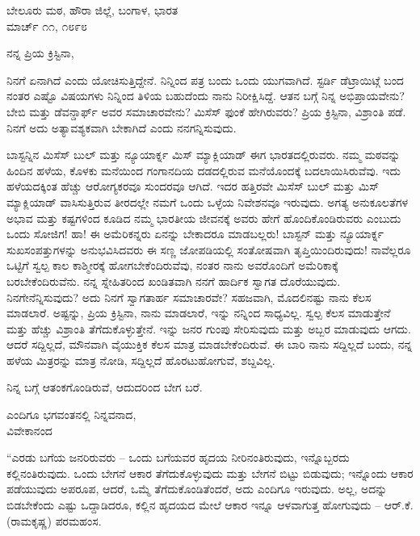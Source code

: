 \begin{flushright}
ಬೇಲೂರು ಮಠ, ಹೌರಾ ಜಿಲ್ಲೆ, ಬಂಗಾಳ, ಭಾರತ\\ಮಾರ್ಚ್ ೧೧, ೧೮೯೮
\end{flushright}

ನನ್ನ ಪ್ರಿಯ ಕ್ರಿಸ್ಟಿನಾ,

ನಿನಗೆ ಏನಾಗಿದೆ ಎಂದು ಯೋಚಿಸುತ್ತಿದ್ದೇನೆ. ನಿನ್ನಿಂದ ಪತ್ರ ಬಂದು ಒಂದು ಯುಗವಾಗಿದೆ. ಸ್ಟರ್ಡಿ ಡೆಟ್ರಾಯಿಟ್ಗೆ ಬಂದ ನಂತರ ಎಷ್ಟೊ ವಿಷಯಗಳು ನಿನ್ನಿಂದ ತಿಳಿಯ ಬಹುದೆಂದು ನಾನು ನಿರೀಕ್ಷಿಸಿದ್ದೆ. ಆತನ ಬಗ್ಗೆ ನಿನ್ನ ಅಭಿಪ್ರಾಯವೇನು? ಬೇಬಿ ಮತ್ತು ಡೆವನ್ಡಾರ್ಫ್ ಅವರ ಸಮಾಚಾರವೇನು? ಮಿಸೆಸ್ ಫುಂಕೆ ಹೇಗಿರುವರು? ಪ್ರಿಯ ಕ್ರಿಸ್ಟಿನಾ, ವಿಶ್ರಾಂತಿ ಪಡೆ. ನಿನಗೆ ಅದು ಅತ್ಯಾವಶ್ಯಕವಾಗಿ ಬೇಕಾಗಿದೆ ಎಂದು ನನಗನ್ನಿಸುವುದು.

ಬಾಸ್ಟನ್ನಿನ ಮಿಸೆಸ್ ಬುಲ್ ಮತ್ತು ನ್ಯೂಯಾರ್ಕ್ನ ಮಿಸ್ ಮ್ಯಾಕ್ಲಿಯಾಡ್ ಈಗ ಭಾರತದಲ್ಲಿರುವರು. ನಮ್ಮ ಮಠವನ್ನು ಹಿಂದಿನ ಹಳೆಯ, ಕೊಳಕು ಮನೆಯಿಂದ ಗಂಗಾನದಿಯ ದಡದಲ್ಲಿರುವ ಮನೆಯೊಂದಕ್ಕೆ ಬದಲಾಯಿಸಿರುವೆವು. ಇದು ಹಳೆಯದಕ್ಕಿಂತ ಹೆಚ್ಚು ಆರೋಗ್ಯಕರವೂ ಸುಂದರವೂ ಆಗಿದೆ. ಇದರ ಹತ್ತಿರವೇ ಮಿಸೆಸ್ ಬುಲ್ ಮತ್ತು ಮಿಸ್ ಮ್ಯಾಕ್ಲಿಯಾಡ್ ವಾಸಿಸುತ್ತಿರುವ ತೀರದಲ್ಲೇ ನಮಗೆ ಒಂದು ಒಳ್ಳೆಯ ನಿವೇಶನವೂ ಇರುವುದು. ಅಗತ್ಯ ಅನುಕೂಲತೆಗಳ ಅಭಾವ ಮತ್ತು ಕಷ್ಟಗಳಿಂದ ಕೂಡಿದ ನಮ್ಮ ಭಾರತೀಯ ಜೀವನಕ್ಕೆ ಅವರು ಹೇಗೆ ಹೊಂದಿಕೊಂಡಿರುವರು ಎಂಬುದು ಒಂದು ಸೋಜಿಗ! ಹಾ! ಈ ಅಮೆರಿಕನ್ನರು ಏನನ್ನು ಬೇಕಾದರೂ ಮಾಡಬಲ್ಲರು! ಬಾಸ್ಟನ್ ಮತ್ತು ನ್ಯೂಯಾರ್ಕ್ನ ಸುಖಸಂಪತ್ತುಗಳನ್ನು ಅನುಭವಿಸಿದವರು ಈ ಸಣ್ಣ ಜೋಪಡಿಯಲ್ಲಿ ಸಂತೋಷವಾಗಿ ತೃಪ್ತಿಯಿಂದಿರುವುದು! ನಾವೆಲ್ಲರೂ ಒಟ್ಟಿಗೆ ಸ್ವಲ್ಪ ಕಾಲ ಕಾಶ್ಮೀರಕ್ಕೆ ಹೋಗಬೇಕೆಂದಿರುವೆವು, ನಂತರ ನಾನು ಅವರೊಂದಿಗೆ ಅಮೆರಿಕಾಕ್ಕೆ ಬರಬೇಕೆಂದಿರುವೆನು. ನನ್ನ ಸ್ನೇಹಿತರಿಂದ ಖಂಡಿತವಾಗಿ ನನಗೆ ಹಾರ್ದಿಕ ಸ್ವಾಗತ ದೊರೆಯುವುದು. ನಿನಗೇನೆನ್ನಿಸುವುದು? ಅದು ನಿನಗೆ ಸ್ವಾಗತಾರ್ಹ ಸಮಾಚಾರವೇ? ಸಹಜವಾಗಿ, ಮೊದಲಿನಷ್ಟು ನಾನು ಕೆಲಸ ಮಾಡಲಾರೆ. ಅಷ್ಟನ್ನು, ಪ್ರಿಯ ಕ್ರಿಸ್ಟಿನಾ, ನಾನು ಮಾಡಲಾರೆ, ಇನ್ನು ನನ್ನಿಂದ ಸಾಧ್ಯವಿಲ್ಲ. ಸ್ವಲ್ಪ ಕೆಲಸ ಮಾಡುತ್ತೇನೆ ಮತ್ತು ಹೆಚ್ಚು ವಿಶ್ರಾಂತಿ ತೆಗೆದುಕೊಳ್ಳುತ್ತೇನೆ. ಇನ್ನು ಜನರ ಗುಂಪು ಸೇರಿಸುವುದು ಮತ್ತು ಅಬ್ಬರ ಮಾಡುವುದು ಆಗದು. ಆದರೆ ಸದ್ದಿಲ್ಲದೆ, ಮೌನವಾಗಿ ವೈಯುಕ್ತಿಕ ಕೆಲಸ ಮಾತ್ರ ಮಾಡಬೇಕೆಂದಿರುವೆ. ಈ ಬಾರಿ ನಾನು ಸದ್ದಿಲ್ಲದೆ ಬಂದು, ನನ್ನ ಹಳೆಯ ಮಿತ್ರರನ್ನು ಮಾತ್ರ ನೋಡಿ, ಸದ್ದಿಲ್ಲದೆ ಹೊರಟುಹೋಗುವೆ, ಶಬ್ದವಿಲ್ಲ.

ನಿನ್ನ ಬಗ್ಗೆ ಆತಂಕಗೊಂಡಿರುವೆ, ಆದುದರಿಂದ ಬೇಗ ಬರೆ.

\begin{flushright}
ಎಂದಿಗೂ ಭಗವಂತನಲ್ಲಿ ನಿನ್ನವನಾದ,\\ವಿವೇಕಾನಂದ
\end{flushright}

“ಎರಡು ಬಗೆಯ ಜನರಿರುವರು – ಒಂದು ಬಗೆಯವರ ಹೃದಯ ನೀರಿನಂತಿರುವುದು, ಇನ್ನೊಬ್ಬರದು ಕಲ್ಲಿನಂತಿರುವುದು. ಒಂದು ಬೇಗನೆ ಆಕಾರ ತೆಗೆದುಕೊಳ್ಳುವುದು ಮತ್ತು ಬೇಗನೆ ಬಿಟ್ಟು ಬಿಡುವುದು; ಇನ್ನೊಂದು ಆಕಾರ ಪಡೆಯುವುದು ಅಪರೂಪ, ಆದರೆ, ಒಮ್ಮೆ ತೆಗೆದುಕೊಂಡಿತೆಂದರೆ, ಅದು ಎಂದಿಗೂ ಇರುವುದು. ಅಲ್ಲ, ಅದನ್ನು ಬಿಡಬೇಕೆಂದು ಎಷ್ಟು ಒದ್ದಾಡಿದರೂ, ಕಲ್ಲಿನ ಹೃದಯದ ಮೇಲೆ ಆಕಾರ ಇನ್ನೂ ಆಳವಾಗುತ್ತ ಹೋಗುವುದು – ಆರ್.ಕೆ. (ರಾಮಕೃಷ್ಣ) ಪರಮಹಂಸ.

